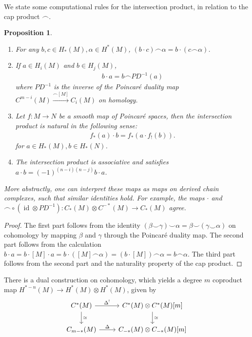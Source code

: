 \documentclass{scrartcl}
\theoremstyle{plain}
\newtheorem{proposition}[theorem]{Proposition}
\theoremstyle{definition}
\newcommand{\capp}{\mathbin{\frown}}
\newcommand{\cupp}{\mathbin{\smile}}
\newcommand{\quiso}{\simeq}
\let\xto\xrightarrow
\DeclareMathOperator{\id}{id}
\newcommand{\comp}{\mathbin{\circ}}
\begin{document}
We state some computational rules for the intersection product, in relation to the cap product $\capp$.
\begin{proposition}\label{prop:isect-naturality}
    \begin{enumerate}
        \item For any $b, c \in H_*(M), \alpha\in H^*(M)$, $(b\cdot c)\capp \alpha = b\cdot (c\capp \alpha)$.
        \item If $a\in H_i(M)$ and $b\in H_j(M)$,
        \begin{align*}
            b\cdot a = b\capp PD^{-1}(a)
        \end{align*}
        where $PD^{-1}$ is the inverse of the Poincaré duality map $C^{m-i}(M)\xto{\capp [M]} C_{i}(M)$ on homology.
        \item Let $f\colon M\to N$ be a smooth map of Poincaré spaces, then the intersection product is natural in the following sense: 
        \begin{align*}
            f_*(a) \cdot b = f_*(a \cdot f_!(b)).
        \end{align*}
        for $a\in H_*(M), b\in H_*(N)$.
        \item The intersection product is associative and satisfies $a\cdot b = (-1)^{(n-i)(n-j)}b\cdot a$.
    \end{enumerate}
    More abstractly, one can interpret these maps as maps on derived chain complexes, such that similar identities hold. For example, the maps $\cdot$ and $\capp \comp (\id\otimes PD^{-1})\colon C_*(M) \otimes C^{-*}(M) \to C_{*}(M)$ agree. 
\end{proposition}
\begin{proof}
    The first part follows from the identity $(\beta\cupp \gamma) \cupp \alpha = \beta \cupp (\gamma \cupp \alpha)$ on cohomology by mapping $\beta$ and $\gamma$ through the Poincaré duality map. The second part follows from the calculation $b\cdot a = b\cdot [M]\cdot a = b\cdot ([M]\capp \alpha) = (b\cdot [M]) \capp \alpha = b\capp \alpha$. The third part follows from the second part and the naturality property of the cap product. 
\end{proof}


There is a dual construction on cohomology, which yields a degree $m$ coproduct map $H^{*-n}(M)\to H^*(M)\otimes H^*(M)$, given by 
\begin{equation}
    \begin{tikzcd}
        C^*(M) \dar["\quiso"]\rar["\Delta^!"] & C^*(M)\otimes C^*(M)[m] \dar["\quiso"]\\
        C_{m-*}(M)  \rar["\Delta"] & C_{-*}(M)\otimes C_{-*}(M)[m]
    \end{tikzcd}
\end{equation}
\end{document}
